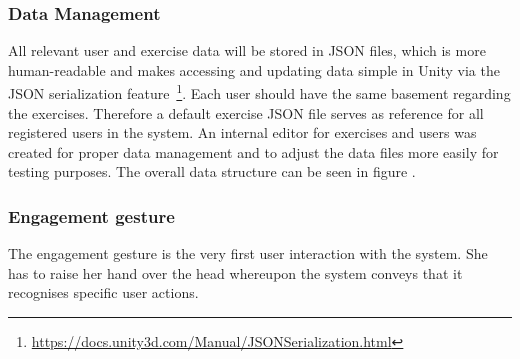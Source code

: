 \subsubsection{Data Management}
All relevant user and exercise data will be stored in JSON files, which is more human-readable and makes accessing and updating data simple in Unity via the JSON serialization feature~\footnote{\url{https://docs.unity3d.com/Manual/JSONSerialization.html}}. Each user should have the same basement regarding the exercises. Therefore a default exercise JSON file serves as reference for all registered users in the system. An internal editor for exercises and users was created for proper data management and to adjust the data files more easily for testing purposes. The overall data structure can be seen in figure .








\subsubsection{Engagement gesture}
The engagement gesture is the very first user interaction with the system. %
She has to raise her hand over the head whereupon the system conveys that it recognises specific user actions. 

